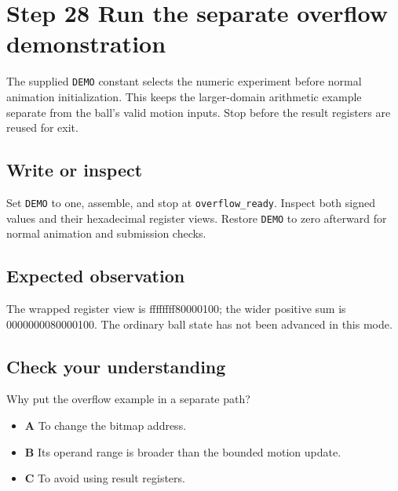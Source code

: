 \section{Step 28 Run the separate overflow demonstration}\label{ball-s28}

The supplied \texttt{DEMO} constant selects the numeric experiment before normal animation initialization. This keeps the larger-domain arithmetic example separate from the ball’s valid motion inputs. Stop before the result registers are reused for exit.

\subsection{Write or inspect}
Set \texttt{DEMO} to one, assemble, and stop at \texttt{overflow\_ready}. Inspect both signed values and their hexadecimal register views. Restore \texttt{DEMO} to zero afterward for normal animation and submission checks.

\subsection{Expected observation}
The wrapped register view is ffffffff80000100; the wider positive sum is 0000000080000100. The ordinary ball state has not been advanced in this mode.

\subsection{Check your understanding}
Why put the overflow example in a separate path?

\begin{itemize}
  \item \textbf{A} To change the bitmap address.
  \item \textbf{B} Its operand range is broader than the bounded motion update.
  \item \textbf{C} To avoid using result registers.
\end{itemize}
